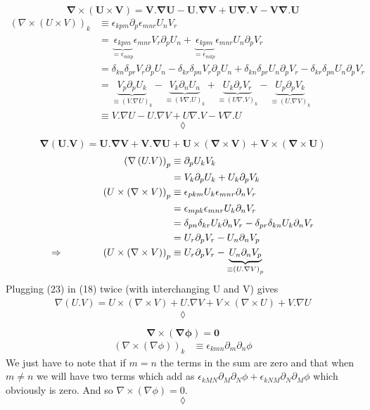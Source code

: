$$ \mathbf{\nabla \times  \left( U\times V \right) = V . \nabla U -  U . \nabla V+U\nabla . V-V\nabla.U}$$
\begin{align}
\left(\nabla \times  \left( U\times V \right) \right)_k &\equiv \epsilon_{kpm}\partial_p \epsilon_{mnr}U_n V_r\\
&=  \underbrace{\epsilon_{kpm}}_{= \epsilon_{mkp}}\epsilon_{mnr}V_r\partial_p U_n + \underbrace{\epsilon_{kpm}}_{= \epsilon_{mkp}}\epsilon_{mnr}U_n\partial_p V_r \\
&= \delta_{kn}\delta_{pr}V_r\partial_p U_n -\delta_{kr}\delta_{pn}V_r\partial_p U_n +\delta_{kn}\delta_{pr}U_n\partial_p V_r-\delta_{kr}\delta_{pn}U_n\partial_p V_r\\
&= \underbrace{V_p\partial_p U_k}_{\equiv \left(V .\nabla U\right)_k} -\underbrace{V_k\partial_n U_n}_{\equiv \left(V\nabla .U\right)_k} +\underbrace{U_k\partial_r V_r}_{\equiv \left(U\nabla .V\right)_k}-\underbrace{U_p\partial_p V_k}_{\equiv \left(U .\nabla V\right)_k}\\
&\equiv V .\nabla U-U .\nabla V+U\nabla .V-V\nabla .U
\end{align}
$$\lozenge$$

$$ \mathbf{\nabla \left( U. V \right) = U . \nabla V + V . \nabla U+U\times\left(\nabla \times V\right)+V\times\left(\nabla \times U\right)}$$
\begin{align}
\left(\nabla \left( U. V \right) \right)_p &\equiv \partial_p U_k V_k\\
&=  V_k\partial_p U_k +U_k\partial_p  V_k\\
\left(U\times\left(\nabla\times V\right)\right)_p &\equiv \epsilon_{pkm} U_k\epsilon_{mnr}\partial_n V_r\\
&=\epsilon_{mpk} \epsilon_{mnr}U_k\partial_n V_r\\
&=\delta_{pn}\delta_{kr}U_k\partial_n V_r-\delta_{pr}\delta_{kn}U_k\partial_n V_r\\
&=U_r\partial_p V_r-U_n\partial_n V_p\\
\Rightarrow\quad\quad\quad\quad \left(U\times\left(\nabla\times V\right)\right)_p &\equiv U_r\partial_p V_r-\underbrace{U_n\partial_n V_p}_{\equiv \left(U.\nabla V\right)_p}
\end{align}
Plugging (23) in (18) twice (with interchanging U and V) gives
\begin{align}
\nabla \left( U. V \right)  =U\times\left(\nabla\times V\right)+U.\nabla V+V\times\left(\nabla\times U\right)+V.\nabla U
\end{align}
$$\lozenge$$

$$ \mathbf{\nabla \times \left(\nabla\phi \right) = 0}$$
\begin{align}
\left(\nabla \times \left(\nabla\phi \right)\right)_k&\equiv \epsilon_{kmn}\partial_m \partial_n\phi
\end{align}
We just have to note that if $m=n$ the terms in the sum are zero and that when $m\ne n$ we will have two terms which add as $\epsilon_{kMN}\partial_M \partial_N\phi + \epsilon_{kNM}\partial_N \partial_M\phi $ which obviously is zero. And so $\nabla \times \left(\nabla\phi \right) = 0$.
$$\lozenge$$

